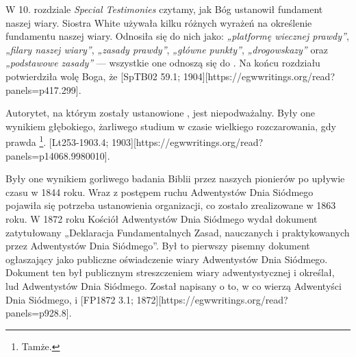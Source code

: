 \label{chap:authority}

W 10. rozdziale \textit{Special Testimonies} czytamy, jak Bóg ustanowił fundament naszej wiary. Siostra White używała kilku różnych wyrażeń na określenie fundamentu naszej wiary. Odnosiła się do nich jako: \textit{„platformę wiecznej prawdy”}, \textit{„filary naszej wiary”}, \textit{„zasady prawdy”}, \textit{„główne punkty”}, \textit{„drogowskazy”} oraz \textit{„podstawowe zasady”} — wszystkie one odnoszą się do . Na końcu rozdziału potwierdziła wolę Boga, że [SpTB02 59.1; 1904][https://egwwritings.org/read?panels=p417.299].

Autorytet, na którym zostały ustanowione , jest niepodważalny. Były one wynikiem głębokiego, żarliwego studium w czasie wielkiego rozczarowania, gdy prawda \footnote{Tamże.}. [Lt253-1903.4; 1903][https://egwwritings.org/read?panels=p14068.9980010].

Były one wynikiem gorliwego badania Biblii przez naszych pionierów po upływie czasu w 1844 roku. Wraz z postępem ruchu Adwentystów Dnia Siódmego pojawiła się potrzeba ustanowienia organizacji, co zostało zrealizowane w 1863 roku. W 1872 roku Kościół Adwentystów Dnia Siódmego wydał dokument zatytułowany „Deklaracja Fundamentalnych Zasad, nauczanych i praktykowanych przez Adwentystów Dnia Siódmego”. Był to pierwszy pisemny dokument ogłaszający  jako publiczne oświadczenie wiary Adwentystów Dnia Siódmego. Dokument ten był publicznym streszczeniem wiary adwentystycznej i określał,  lud Adwentystów Dnia Siódmego. Został napisany  o to, w co wierzą Adwentyści Dnia Siódmego,  i [FP1872 3.1; 1872][https://egwwritings.org/read?panels=p928.8].

